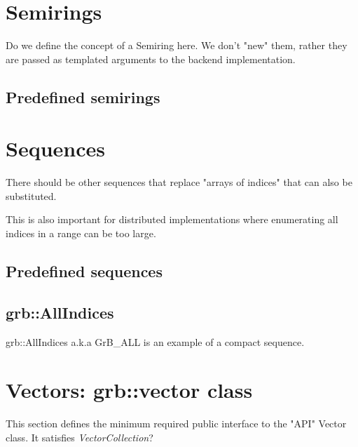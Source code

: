 \section{Semirings}

Do we define the concept of a Semiring here.  We don't "new" them, rather they
are passed as templated arguments to the backend implementation.



\subsection{Predefined semirings}

\section{Sequences}
\label{Sec:Sequences}

There should be other sequences that replace "arrays of indices" that can also be substituted.

This is also important for distributed implementations where enumerating all indices in a range can be too large.

\subsection{Predefined sequences}

\subsection{\sf grb::AllIndices}

{\sf grb::AllIndices} a.k.a {\sf GrB\_ALL} is an example of a compact sequence.

\section{Vectors: {\sf grb::vector} class}
\label{Sec:Vectors}

This section defines the minimum required public interface to the "API"  Vector 
class.  It satisfies \textit{VectorCollection}?


